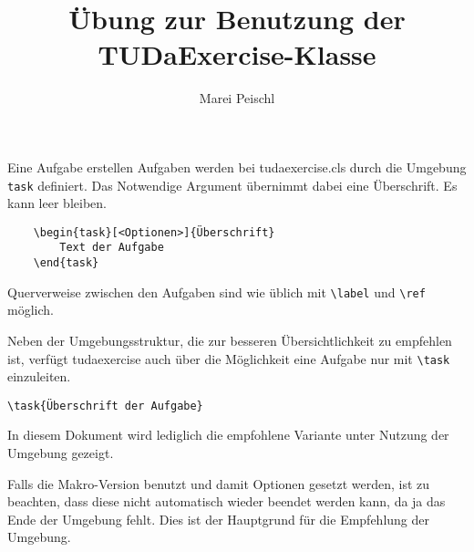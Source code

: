 \documentclass[
	ngerman,
	]{tudaexercise}
\let\code\texttt
\let\cls\textsf
\let\tbs\textbackslash
\begin{document}
	
\title[Übung TUDaExercise]{Übung zur Benutzung der TUDaExercise-Klasse}
\author{Marei Peischl}

\maketitle

\begin{task}{Eine Aufgabe erstellen}
Aufgaben werden bei \cls{tudaexercise.cls} durch die Umgebung \code{task} definiert. Das Notwendige Argument übernimmt dabei eine Überschrift. Es kann leer bleiben.

\begin{verbatim}
	\begin{task}[<Optionen>]{Überschrift}
		Text der Aufgabe
	\end{task}
\end{verbatim}

Querverweise zwischen den Aufgaben sind wie üblich mit \code{\tbs{}label} und \code{\tbs{}ref} möglich.

Neben der Umgebungsstruktur, die zur besseren Übersichtlichkeit zu empfehlen ist, verfügt tudaexercise auch über die Möglichkeit eine Aufgabe nur mit \code{\tbs{}task} einzuleiten.

\begin{verbatim}
\task{Überschrift der Aufgabe}
\end{verbatim}

In diesem Dokument wird lediglich die empfohlene Variante unter Nutzung der Umgebung gezeigt.

Falls die Makro-Version benutzt und damit Optionen gesetzt werden, ist zu beachten, dass diese nicht automatisch wieder beendet werden kann, da ja das Ende der Umgebung fehlt. Dies ist der Hauptgrund für die Empfehlung der Umgebung.
\end{task}
\end{document}
